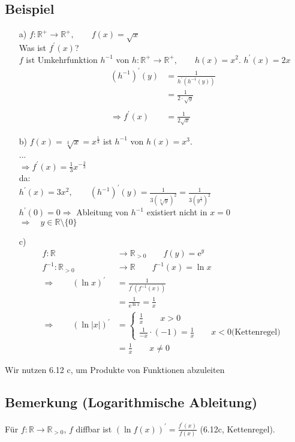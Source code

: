 \documentclass[12pt, titlepage]{article}
\newcommand{\R}{\mathds{R}}
\newcommand{\e}{\textrm{e}}
\renewcommand{\>}{\rightarrow}
\renewcommand{\*}{\cdot}
\begin{document}
	\subsection{Beispiel}
	\begin{itemize}
		\item[a)] $f\colon\R^+\>\R^+,\qquad f(x)=\sqrt{x}$\\
		Was ist $f^\prime(x)$?\\
		$f$ ist Umkehrfunktion $h^{-1}$ von $h\colon\R^+\>\R^+,\qquad h(x)=x^2$. $h^\prime(x)=2x$
		\begin{align*}
			(h^{-1})^\prime(y)&=\frac{1}{h^\prime(h^{-1}(y))}\\
			&=\frac{1}{2\*\sqrt{y}}\\
			&\\
			\Rightarrow f^\prime(x)&=\frac{1}{2\sqrt{x}}
		\end{align*}
		\item[b)] $f(x)=\sqrt[3]{x}=x^\frac{1}{3}$ ist $h^{-1}$ von $h(x)=x^3$.\\
		...\\
		$\Rightarrow f^\prime(x)=\frac{1}{3}x^{-\frac{2}{3}}$\\
		da:\\
		$h^\prime(x)=3x^2,\qquad (h^{-1})^\prime(y)=\frac{1}{3(\sqrt[3]{y})^2}=\frac{1}{3(y^\frac{1}{3})^2}$\\
		$h^\prime(0)=0\Rightarrow$ Ableitung von $h^{-1}$ existiert nicht in $x=0$\\
		$\Rightarrow \quad y\in\R\setminus\{0\}$
		\item[c)] \begin{align*}
			f\colon \R&\>\R_{>0}\qquad f(y)=\e^y\\
			f^{-1}\colon \R_{>0}&\>\R\qquad f^{-1}(x)=\ln x\\
			\Rightarrow\qquad (\ln x)^\prime&=\frac{1}{f^\prime(f^{-1}(x))}\\
			&=\frac{1}{\e^{\ln x}}=\frac{1}{x}\\
			\Rightarrow\qquad (\ln|x|)^\prime&=\begin{cases}\frac{1}{x}\qquad x>0\\
			\frac{1}{-x}\*(-1)=\frac{1}{x}\qquad x<0\textrm{(Kettenregel)}
			\end{cases}\\
			&=\frac{1}{x}\qquad x\neq 0
		\end{align*}
	\end{itemize}
	Wir nutzen 6.12 c, um Produkte von Funktionen abzuleiten
	\subsection{Bemerkung (Logarithmische Ableitung)}
	Für $f\colon\R\>\R_{>0}$, $f$ diffbar ist $(\ln f(x))^\prime=\frac{f^\prime(x)}{f(x)}$ (6.12c, Kettenregel).\\
\end{document}
